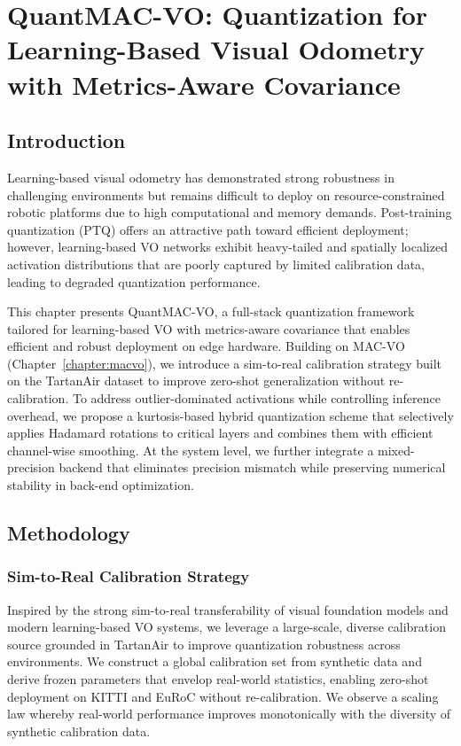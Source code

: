 \chapter{QuantMAC-VO: Quantization for Learning-Based Visual Odometry with Metrics-Aware Covariance} \label{chapter:quantmacvo}

\section{Introduction}

Learning-based visual odometry has demonstrated strong robustness in challenging environments but remains difficult to deploy on resource-constrained robotic platforms due to high computational and memory demands. Post-training quantization (PTQ) offers an attractive path toward efficient deployment; however, learning-based VO networks exhibit heavy-tailed and spatially localized activation distributions that are poorly captured by limited calibration data, leading to degraded quantization performance.

This chapter presents QuantMAC-VO, a full-stack quantization framework tailored for learning-based VO with metrics-aware covariance that enables efficient and robust deployment on edge hardware. Building on MAC-VO (Chapter~\ref{chapter:macvo}), we introduce a sim-to-real calibration strategy built on the TartanAir dataset to improve zero-shot generalization without re-calibration. To address outlier-dominated activations while controlling inference overhead, we propose a kurtosis-based hybrid quantization scheme that selectively applies Hadamard rotations to critical layers and combines them with efficient channel-wise smoothing. At the system level, we further integrate a mixed-precision backend that eliminates precision mismatch while preserving numerical stability in back-end optimization.

\section{Methodology}

\subsection{Sim-to-Real Calibration Strategy}

Inspired by the strong sim-to-real transferability of visual foundation models and modern learning-based VO systems, we leverage a large-scale, diverse calibration source grounded in TartanAir to improve quantization robustness across environments. We construct a global calibration set from synthetic data and derive frozen parameters that envelop real-world statistics, enabling zero-shot deployment on KITTI and EuRoC without re-calibration. We observe a scaling law whereby real-world performance improves monotonically with the diversity of synthetic calibration data.

